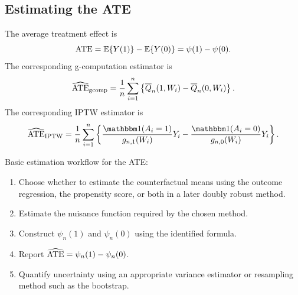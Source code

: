 \subsection{Estimating the ATE}

The average treatment effect is
\[
\operatorname{ATE}=\mathbb{E}\{Y(1)\}-\mathbb{E}\{Y(0)\}=\psi(1)-\psi(0).
\]
The corresponding g-computation estimator is
\[
\widehat{\operatorname{ATE}}_{\mathrm{gcomp}}
=
\frac{1}{n}\sum_{i=1}^n
\left\{
\overline{Q}_n(1,W_i)-\overline{Q}_n(0,W_i)
\right\}.
\]
The corresponding IPTW estimator is
\[
\widehat{\ATE}_{\IPTW}
=
\frac{1}{n}\sum_{i=1}^n
\left\{
\frac{\ind(A_i=1)}{g_{n,1}(W_i)}Y_i
-
\frac{\ind(A_i=0)}{g_{n,0}(W_i)}Y_i
\right\}.
\]

\begin{estimationbox}
Basic estimation workflow for the ATE:
\begin{enumerate}
\item Choose whether to estimate the counterfactual means using the outcome
regression, the propensity score, or both in a later doubly robust method.
\item Estimate the nuisance function required by the chosen method.
\item Construct $\psi_n(1)$ and $\psi_n(0)$ using the identified formula.
\item Report $\widehat{\operatorname{ATE}}=\psi_n(1)-\psi_n(0)$.
\item Quantify uncertainty using an appropriate variance estimator or resampling
method such as the bootstrap.
\end{enumerate}
\end{estimationbox}

